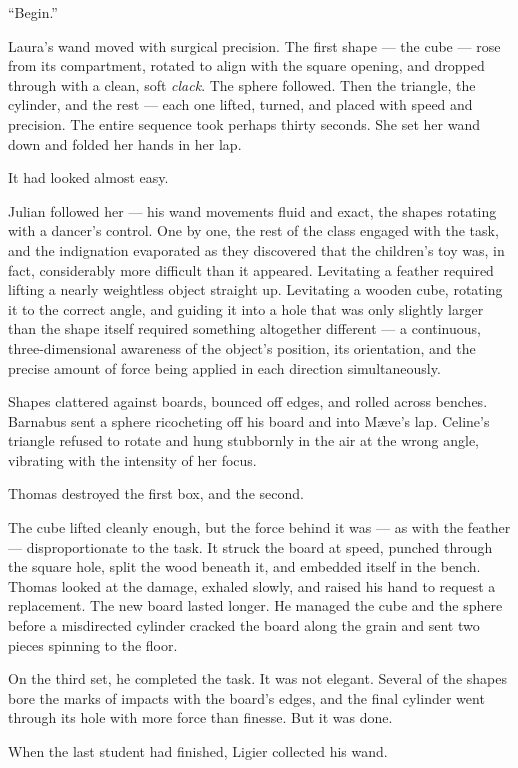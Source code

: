 \enquote{Begin.}
 
Laura's wand moved with surgical precision. The first shape --- the cube --- rose from its compartment, rotated to align with the square opening, and dropped through with a clean, soft \textit{clack}. The sphere followed. Then the triangle, the cylinder, and the rest --- each one lifted, turned, and placed with speed and precision. The entire sequence took perhaps thirty seconds. She set her wand down and folded her hands in her lap.
 
It had looked almost easy.
 
Julian followed her --- his wand movements fluid and exact, the shapes rotating with a dancer's control. One by one, the rest of the class engaged with the task, and the indignation evaporated as they discovered that the children's toy was, in fact, considerably more difficult than it appeared. Levitating a feather required lifting a nearly weightless object straight up. Levitating a wooden cube, rotating it to the correct angle, and guiding it into a hole that was only slightly larger than the shape itself required something altogether different --- a continuous, three-dimensional awareness of the object's position, its orientation, and the precise amount of force being applied in each direction simultaneously.
 
Shapes clattered against boards, bounced off edges, and rolled across benches. Barnabus sent a sphere ricocheting off his board and into Mæve's lap. Celine's triangle refused to rotate and hung stubbornly in the air at the wrong angle, vibrating with the intensity of her focus.
 
Thomas destroyed the first box, and the second.
 
The cube lifted cleanly enough, but the force behind it was --- as with the feather --- disproportionate to the task. It struck the board at speed, punched through the square hole, split the wood beneath it, and embedded itself in the bench. Thomas looked at the damage, exhaled slowly, and raised his hand to request a replacement. The new board lasted longer. He managed the cube and the sphere before a misdirected cylinder cracked the board along the grain and sent two pieces spinning to the floor.
 
On the third set, he completed the task. It was not elegant. Several of the shapes bore the marks of impacts with the board's edges, and the final cylinder went through its hole with more force than finesse. But it was done.
 
When the last student had finished, Ligier collected his wand.
 
